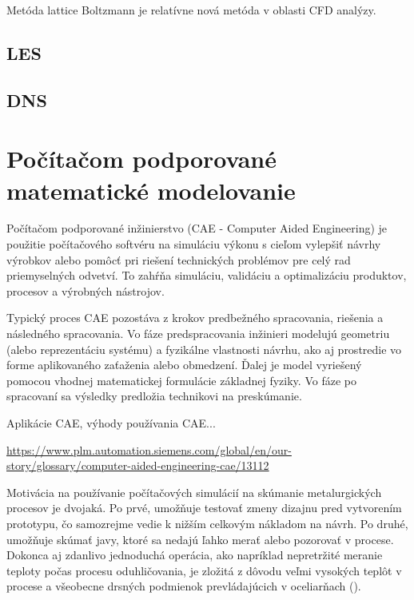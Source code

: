 \documentclass[]{tukediphc}
\begin{document}
Metóda lattice Boltzmann je relatívne nová metóda v oblasti CFD analýzy.

\subsection{LES}

\subsection{DNS}

\section{Počítačom podporované matematické modelovanie}

Počítačom podporované inžinierstvo (CAE - Computer Aided Engineering) je použitie počítačového softvéru na simuláciu výkonu s cieľom vylepšiť návrhy výrobkov alebo pomôcť pri riešení technických problémov pre celý rad priemyselných odvetví. To zahŕňa simuláciu, validáciu a optimalizáciu produktov, procesov a výrobných nástrojov.

Typický proces CAE pozostáva z krokov predbežného spracovania, riešenia a následného spracovania. Vo fáze predspracovania inžinieri modelujú geometriu (alebo reprezentáciu systému) a fyzikálne vlastnosti návrhu, ako aj prostredie vo forme aplikovaného zaťaženia alebo obmedzení. Ďalej je model vyriešený pomocou vhodnej matematickej formulácie základnej fyziky. Vo fáze po spracovaní sa výsledky predložia technikovi na preskúmanie.

Aplikácie CAE, výhody používania CAE...

\url{https://www.plm.automation.siemens.com/global/en/our-story/glossary/computer-aided-engineering-cae/13112}

Motivácia na používanie počítačových simulácií na skúmanie metalurgických procesov je dvojaká. Po prvé, umožňuje testovať zmeny dizajnu pred vytvorením prototypu, čo samozrejme vedie k nižším celkovým nákladom na návrh. Po druhé, umožňuje skúmať javy, ktoré sa nedajú ľahko merať alebo pozorovať v procese. Dokonca aj zdanlivo jednoduchá operácia, ako napríklad nepretržité meranie teploty počas procesu oduhličovania, je zložitá z dôvodu veľmi vysokých teplôt v procese a všeobecne drsných podmienok prevládajúcich v oceliarňach (\citep{Ersson2018}).
\end{document}
